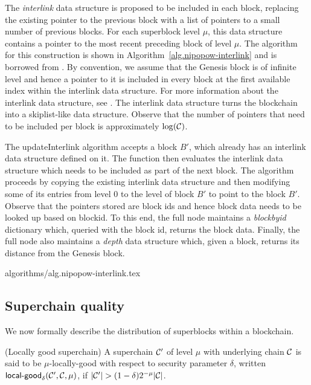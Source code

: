 The \textit{interlink} data structure is proposed to be included in each block,
replacing the existing pointer to the previous block with a list of pointers to
a small number of previous blocks. For each superblock level $\mu$, this data
structure contains a pointer to the most recent preceding block of level
$\mu$. The algorithm for this construction is shown in
Algorithm~\ref{alg.nipopow-interlink} and is borrowed from \cite{KLS}. By
convention, we assume that the Genesis block is of infinite level and hence a
pointer to it is included in every block at the first available index within
the interlink data structure. For more information about the interlink data
structure, see \cite{KLS}. The interlink data structure turns the blockchain
into a skiplist-like data structure. Observe that the number of pointers that
need to be included per block is approximately $\log(\mathcal{C})$.

The updateInterlink algorithm accepts a block $B'$, which already has an
interlink data structure defined on it. The function then evaluates the
interlink data structure which needs to be included as part of the next block.
The algorithm proceeds by copying the existing interlink data structure and
then modifying some of its entries from level $0$ to the level of block $B'$ to
point to the block $B'$. Observe that the pointers stored are block ids and
hence block data needs to be looked up based on blockid. To this end, the full
node maintains a \textit{blockbyid} dictionary which, queried with the block
id, returns the block data. Finally, the full node also maintains a
\textit{depth} data structure which, given a block, returns its distance from
the Genesis block.

{algorithms/alg.nipopow-interlink.tex}

\subsection{Superchain quality}

We now formally describe the distribution of superblocks within a blockchain.

\begin{definition}{(Locally good superchain)}
A superchain $\mathcal{C}'$ of level
$\mu$ with underlying chain $\mathcal{C}$ is said to be $\mu$-\textnormal{locally-good}
with respect to security parameter $\delta$, written
$\textsf{local-good}_{\delta}(\mathcal{C}', \mathcal{C}, \mu)$, if $|\mathcal{C}'| > (1 -
\delta)2^{-\mu}|\mathcal{C}|$.
\end{definition}

